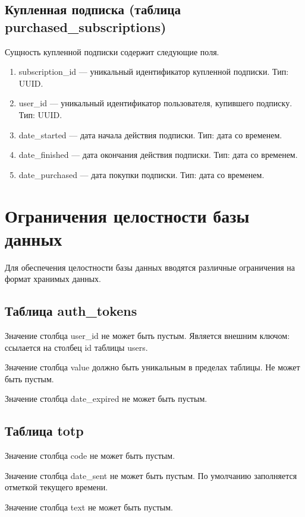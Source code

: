 \subsection{Купленная подписка (таблица purchased\_subscriptions)}

Сущность купленной подписки содержит следующие поля.

\begin{enumerate}
	\item subscription\_id --- уникальный идентификатор купленной подписки. Тип: UUID.
	\item user\_id --- уникальный идентификатор пользователя, купившего подписку. Тип:
	      UUID.
	\item date\_started --- дата начала действия подписки. Тип: дата со временем.
	\item date\_finished --- дата окончания действия подписки. Тип: дата со временем.
	\item date\_purchased --- дата покупки подписки. Тип: дата со временем.
\end{enumerate}

\section{Ограничения целостности базы данных}

Для обеспечения целостности базы данных вводятся различные ограничения на формат хранимых данных.

\subsection{Таблица auth\_tokens}

Значение столбца user\_id не может быть пустым. Является внешним ключом: ссылается на столбец id таблицы users.

Значение столбца value должно быть уникальным в пределах таблицы. Не может быть пустым.

Значение столбца date\_expired не может быть пустым.

\subsection{Таблица totp}

Значение столбца code не может быть пустым.

Значение столбца date\_sent не может быть пустым. По умолчанию заполняется отметкой текущего времени.

Значение столбца text не может быть пустым.

